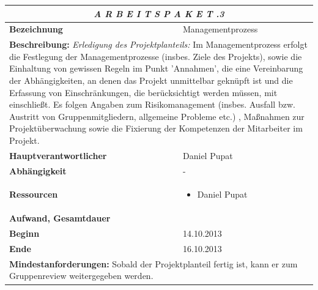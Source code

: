 \documentclass[fontsize=12pt,paper=a4,twoside]{scrartcl}
\begin{document}
\begin{tabular}{p{7.5cm}|p{7.5cm}}\toprule
\multicolumn{2}{c}{\textbf{\textit{A R B E I T S P A K E T \quad 1.1.3}}} \\ \toprule \hline
\textbf{Bezeichnung} & Managementprozess\\\hline
\multicolumn{2}{p{15cm}}{\textbf{Beschreibung:} \newline 
\textit{Erledigung des Projektplanteils:} Im Managementprozess erfolgt die Festlegung der Managementprozesse (insbes. Ziele des Projekts), sowie die Einhaltung von gewissen Regeln im Punkt 'Annahmen', die eine Vereinbarung der Abhängigkeiten, an denen das Projekt unmittelbar geknüpft ist und die Erfassung von Einschränkungen, die berücksichtigt werden müssen, mit einschließt. Es folgen Angaben zum Risikomanagement (insbes. Ausfall bzw. Austritt von Gruppenmitgliedern, allgemeine Probleme etc.) , Maßnahmen zur Projektüberwachung sowie die Fixierung der Kompetenzen der Mitarbeiter im Projekt.  }  \\\hline
\textbf{Hauptverantwortlicher} & Daniel Pupat\\\hline
\textbf{Abhängigkeit} & -\\\hline
\textbf{Ressourcen} & \begin{itemize}
\itemsep0pt
\item Daniel Pupat
\end{itemize} \\\hline
\textbf{Aufwand, Gesamtdauer} & \\\hline
\textbf{Beginn} & 14.10.2013 \\\hline
\textbf{Ende} & 16.10.2013\\\hline
\multicolumn{2}{p{15cm}}{\textbf{Mindestanforderungen: } \newline
Sobald der Projektplanteil fertig ist, kann er zum Gruppenreview weitergegeben werden. }  \\ \toprule
\end{tabular} \\\\
\end{document}
